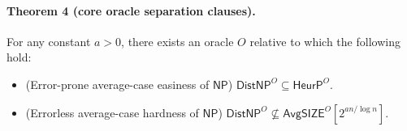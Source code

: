 \paragraph{Theorem 4 (core oracle separation clauses).}
For any constant $a>0$, there exists an oracle $O$ relative to which the following hold:
\begin{itemize}
\item (Error-prone average-case easiness of $\mathsf{NP}$) $\mathsf{DistNP}^{O}\subseteq\mathsf{HeurP}^{O}$.
\item (Errorless average-case hardness of $\mathsf{NP}$) $\mathsf{DistNP}^{O}\not\subseteq\mathsf{AvgSIZE}^{O}[2^{an/\log n}]$.
\end{itemize}
